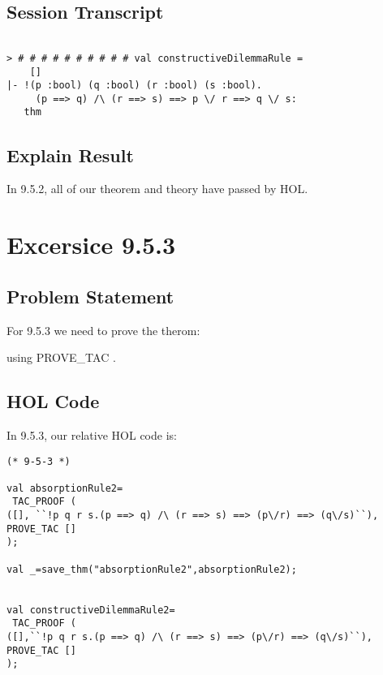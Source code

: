 \documentclass{report}
\begin{document}
\section{Session Transcript}
\label{Session Trans 952}
\setcounter{sessioncount}{0}
\begin{session}
  \begin{scriptsize}
\begin{verbatim}

> # # # # # # # # # # val constructiveDilemmaRule =
    []
|- !(p :bool) (q :bool) (r :bool) (s :bool).
     (p ==> q) /\ (r ==> s) ==> p \/ r ==> q \/ s:
   thm

\end{verbatim}
  \end{scriptsize}
\end{session}
\section{Explain Result}
\label{explain result 952}
In 9.5.2, all of our theorem and theory have passed by HOL.


\chapter{Excersice 9.5.3}
\label{Ex 953}
\section{Problem Statement}
\label{Problem State 953}
For 9.5.3 we need to prove the therom:


using PROVE_TAC .

\section{HOL Code}
\label{HOl Code 953}
In 9.5.3, our relative HOL code is:
\begin{lstlisting}[frame=trBL]
(* 9-5-3 *)

val absorptionRule2=
 TAC_PROOF (
([], ``!p q r s.(p ==> q) /\ (r ==> s) ==> (p\/r) ==> (q\/s)``),
PROVE_TAC []
);

val _=save_thm("absorptionRule2",absorptionRule2);


val constructiveDilemmaRule2=
 TAC_PROOF (
([],``!p q r s.(p ==> q) /\ (r ==> s) ==> (p\/r) ==> (q\/s)``),
PROVE_TAC []
);
\end{lstlisting}
\end{document}
